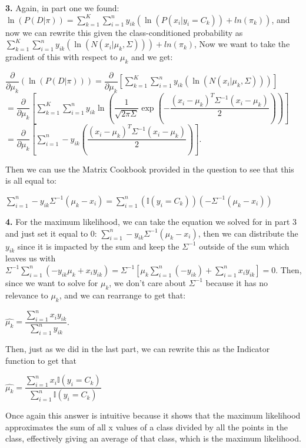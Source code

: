 \documentclass[submit]{harvardml}
\begin{document}
 \textbf{3.} Again, in part one we found: $\ln(P(D | \pi)) = \sum_{k=1}^{K} \sum_{i=1}^{n} y_{ik}(\ln(P(x_i | y_i = C_k)) + ln(\pi_k))$, and now we can rewrite this given the class-conditioned probability as $\sum_{k=1}^{K} \sum_{i=1}^{n} y_{ik}(\ln(N(x_i | \mu_k, \Sigma))) + ln(\pi_k)$, 
 Now we want to take the gradient of this with respect to $\mu_k$ and we get: 
 \begin{center}
  $\dfrac{\partial}{\partial \mu_k} (\ln(P(D | \pi))) = \dfrac{\partial}{\partial \mu_k} [\sum_{k=1}^{K} \sum_{i=1}^{n} y_{ik}(\ln(N(x_i | \mu_k, \Sigma)))]$ \\
  $= \dfrac{\partial}{\partial \mu_k}[\sum_{k=1}^{K} \sum_{i=1}^{n} y_{ik} \ln(\dfrac{1}{\sqrt{2\pi\Sigma}} \exp(-\dfrac{(x_i - \mu_k)^T \Sigma^{-1} (x_i - \mu_k)}{2}))]$ \\
  $= \dfrac{\partial}{\partial \mu_k}[\sum_{i=1}^{n}-y_{ik}(\dfrac{(x_i - \mu_k)^T \Sigma^{-1} (x_i - \mu_k)}{2})]$.
 \end{center}
 Then we can use the Matrix Cookbook provided in the question to see that this is all equal to: 
 \begin{center}
    $\sum_{i=1}^{n} -y_{ik} \Sigma^{-1} (\mu_k - x_i) = \sum_{i=1}^{n} (\mathbb{I}(y_i = C_k))(-\Sigma^{-1} (\mu_k - x_i))$
 \end{center}

 \textbf{4.} For the maximum likelihood, we can take the equation we solved for in part 3 and just set it equal to 0: $\sum_{i=1}^{n} -y_{ik} \Sigma^{-1} (\mu_k - x_i)$, then we can 
 distribute the $y_{ik}$ since it is impacted by the sum and keep the $\Sigma^{-1}$ outside of the sum which leaves us with $\Sigma^{-1} \sum_{i=1}^{n}(-y_{ik}\mu_k + x_i y_{ik}) = \Sigma^{-1} [\mu_k\sum_{i=1}^{n}(-y_{ik}) + \sum_{i=1}^{n} x_i y_{ik}] = 0$.
 Then, since we want to solve for $\mu_k$, we don't care about $\Sigma^{-1}$ because it has no relevance to $\mu_k$, and we can rearrange to get that: 
 \begin{center}
    $\hat{\mu_k} = \dfrac{\sum_{i=1}^{n} x_i y_{ik}}{\sum_{i=1}^{n} y_{ik}}$.
 \end{center}
 Then, just as we did in the last part, we can rewrite this as the Indicator function to get that 
 \begin{center}
    $\hat{\mu_k} = \dfrac{\sum_{i=1}^{n} x_i \mathbb{I}(y_i = C_k)}{\sum_{i=1}^{n} \mathbb{I}(y_i = C_k)}$
 \end{center} 
 Once again this answer is intuitive because it shows that the maximum likelihood approximates the sum of all x values of a class
 divided by all the points in the class, effectively giving an average of that class, which is the maximum likelihood. \\\\
\end{document}
